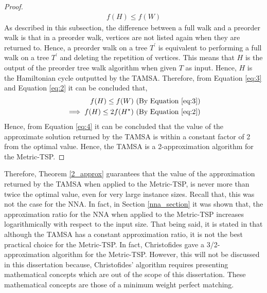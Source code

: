 \documentclass[12pt]{article}
\numberwithin{equation}{subsection}
\numberwithin{table}{subsection}
\numberwithin{algorithm}{subsection}
\numberwithin{figure}{subsection}
\begin{document}
\begin{proof}
\begin{equation}
\begin{split}
   \label{eq:3}
    f(H) \leq f(W)
 \end{split}
 \end{equation}
As described in this subsection, the difference between a full walk and a preorder walk is that in a preorder walk, vertices are not listed again when they are returned to. Hence, a preorder walk on a tree $T^\prime$ is equivalent to performing a full walk on a tree $T^\prime$ and deleting the repetition of vertices. This means that $H$ is the output of the preorder tree walk algorithm when given $T$ as input. Hence, $H$ is the Hamiltonian cycle outputted by the TAMSA. Therefore, from Equation \ref{eq:3} and Equation \ref{eq:2} it can be concluded that,
\begin{equation}
\begin{split}
   \label{eq:4}
    f(H) \leq f(W) \text{ (By Equation \ref{eq:3})}\\
    \implies f(H) \leq 2f(H^\star) \text{ (By Equation \ref{eq:2})}
 \end{split}
 \end{equation}
Hence, from Equation \ref{eq:4} it can be concluded that the value of the approximate solution returned by the TAMSA is within a constant factor of 2 from the optimal value. Hence, the TAMSA is a 2-approximation algorithm for the Metric-TSP.
\end{proof}
Therefore, Theorem \ref{2_approx} guarantees that the value of the approximation returned by the TAMSA when applied to the Metric-TSP, is never more than twice the optimal value, even for very large instance sizes. Recall that, this was not the case for the NNA. In fact, in Section \ref{nna_section} it was shown that, the approximation ratio for the NNA when applied to the Metric-TSP increases logarithmically with respect to the input size. That being said, it is stated in \cite{cormen_leiserson_rivest_stein} that although the TAMSA has a constant approximation ratio, it is not the best practical choice for the Metric-TSP. In fact, Christofides gave a 3/2-approximation algorithm for the Metric-TSP. However, this will not be discussed in this dissertation because, Christofides' algorithm requires presenting mathematical concepts which are out of the scope of this dissertation. These mathematical concepts are those of a minimum weight perfect matching.\\\\
\end{document}
